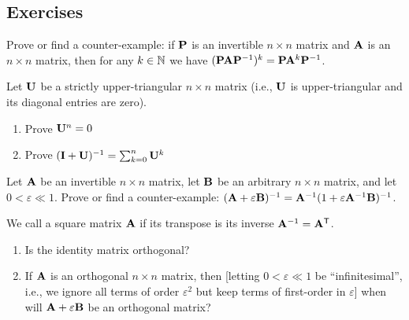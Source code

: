 \subsection*{Exercises}

\begin{exercise}
Prove or find a counter-example: if $\mathbf{P}$ is an invertible $n\times n$
matrix and $\mathbf{A}$ is an $n\times n$ matrix, then for any $k\in\mathbb{N}$ we
have $(\mathbf{P}\mathbf{A}\mathbf{P}^{-1})^{k} = \mathbf{P}\mathbf{A}^{k}\mathbf{P}^{-1}$.
\end{exercise}

\begin{exercise}
Let $\mathbf{U}$ be a strictly upper-triangular $n\times n$ matrix (i.e.,
$\mathbf{U}$ is upper-triangular and its diagonal entries are zero).
\begin{enumerate}
\item Prove $\mathbf{U}^{n}=0$
\item Prove $(\mathbf{I}+\mathbf{U})^{-1} = \sum^{n}_{k=0}\mathbf{U}^{k}$
\end{enumerate}
\end{exercise}

\begin{exercise}
Let $\mathbf{A}$ be an invertible $n\times n$ matrix, let $\mathbf{B}$ be an
arbitrary $n\times n$ matrix, and let $0<\varepsilon\ll1$.
Prove or find a counter-example:
$(\mathbf{A}+\varepsilon\mathbf{B})^{-1} = \mathbf{A}^{-1}(1 + \varepsilon\mathbf{A}^{-1}\mathbf{B})^{-1}$.
\end{exercise}

\begin{exercise}\label{xca:matrix-algebra:orthogonal-matrix}
We call a square matrix $\mathbf{A}$  if its transpose
is its inverse $\mathbf{A}^{-1}=\mathbf{A}^{\mathsf{T}}$.
\begin{enumerate}
\item Is the identity matrix orthogonal?
\item If $\mathbf{A}$ is an orthogonal $n\times n$ matrix, then [letting
  $0<\varepsilon\ll1$ be ``infinitesimal'', i.e., we ignore all terms of
  order $\varepsilon^{2}$ but keep terms of first-order in $\varepsilon$]
  when will $\mathbf{A}+\varepsilon\mathbf{B}$ be an orthogonal matrix?
\end{enumerate}
\end{exercise}
